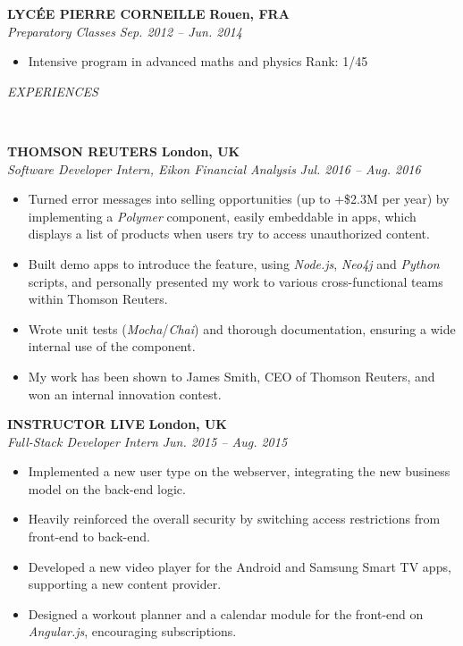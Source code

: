 \documentclass[a4paper, 12pt]{article}
\newcommand{\marginline}{-0.3cm}
\newcommand{\margincontent}{-0.6cm}
\newcommand{\marginbeforesection}{0.3cm}
\newcommand{\linewidthperso}{0.02cm}
\newcommand{\stylesection}[1]{
  \vspace{\marginbeforesection}
  \begin{normalsize}\textit{#1}\end{normalsize}
  \vspace{\marginline}\\
  \noindent\makebox[\linewidth]{\rule{\textwidth}{\linewidthperso}}

}
\newcommand{\styletitle}[1]{\textbf{#1}}
\newcommand{\styledesc}[1]{\textit{#1}}
\newcommand{\styleloc}[1]{\textbf{#1}}
\newcommand{\styledates}[1]{\textit{#1}}
\begin{document}
\begin{footnotesize}
\styletitle{LYC\'EE PIERRE CORNEILLE} \hfill \styleloc{Rouen, FRA}\\
\styledesc{Preparatory Classes} \hfill \styledates{Sep. 2012 -- Jun. 2014}\\
\vspace{\margincontent}
\begin{itemize}
  \item Intensive program in advanced maths and physics \hfill Rank: 1/45
\end{itemize}

\stylesection{EXPERIENCES}

\styletitle{THOMSON REUTERS} \hfill \styleloc{London, UK}\\ 
\styledesc{Software Developer Intern, Eikon Financial Analysis} \hfill \styledates{Jul. 2016 -- Aug. 2016}\\
\vspace{\margincontent}
\begin{itemize}
  \item Turned error messages into selling opportunities (up to +\$2.3M per year) by implementing a \textit{Polymer} component, easily embeddable in apps, which displays a list of products when users try to access unauthorized content.
  \item Built demo apps to introduce the feature, using \textit{Node.js}, \textit{Neo4j} and \textit{Python} scripts, and personally presented my work to various cross-functional teams within Thomson Reuters.
  \item Wrote unit tests (\textit{Mocha}/\textit{Chai}) and thorough documentation, ensuring a wide internal use of the component.
  \item My work has been shown to James Smith, CEO of Thomson Reuters, and won an internal innovation contest.
\end{itemize}

\styletitle{INSTRUCTOR LIVE} \hfill \styleloc{London, UK}\\
\styledesc{Full-Stack Developer Intern} \hfill \styledates{Jun. 2015 -- Aug. 2015}\\
\vspace{\margincontent}
\begin{itemize}
  \item Implemented a new user type on the webserver, integrating the new business model on the back-end logic.
  \item Heavily reinforced the overall security by switching access restrictions from front-end to back-end.
  \item Developed a new video player for the Android and Samsung Smart TV apps, supporting a new content provider.
  \item Designed a workout planner and a calendar module for the front-end on \textit{Angular.js}, encouraging subscriptions.
\end{itemize}


\end{footnotesize}
\end{document}
